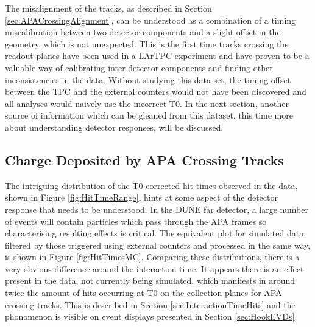 \begin{figure}[tb]
  \centering
  \caption{}
  \label{fig:RemainingCollectionSpacing}
\end{figure}

The misalignment of the tracks, as described in Section \ref{sec:APACrossingAlignment}, can be understood as a combination of a timing miscalibration between two detector components and a slight offset in the geometry, which is not unexpected.  This is the first time tracks crossing the readout planes have been used in a LArTPC experiment and have proven to be a valuable way of calibrating inter-detector components and finding other inconsistencies in the data.  Without studying this data set, the timing offset between the TPC and the external counters would not have been discovered and all analyses would naively use the incorrect T0.  In the next section, another source of information which can be gleaned from this dataset, this time more about understanding detector responses, will be discussed.

\subsection{Charge Deposited by APA Crossing Tracks}\label{sec:APACrossingCharge}

The intriguing distribution of the T0-corrected hit times observed in the data, shown in Figure \ref{fig:HitTimeRange}, hints at some aspect of the detector response that needs to be understood.  In the DUNE far detector, a large number of events will contain particles which pass through the APA frames so characterising resulting effects is critical.  The equivalent plot for simulated data, filtered by those triggered using external counters and processed in the same way, is shown in Figure \ref{fig:HitTimesMC}.  Comparing these distributions, there is a very obvious difference around the interaction time. It appears there is an effect present in the data, not currently being simulated, which manifests in around twice the amount of hits occurring at T0 on the collection planes for APA crossing tracks.  This is described in Section \ref{sec:InteractionTimeHits} and the phonomenon is visible on event displays presented in Section \ref{sec:HookEVDs}.

